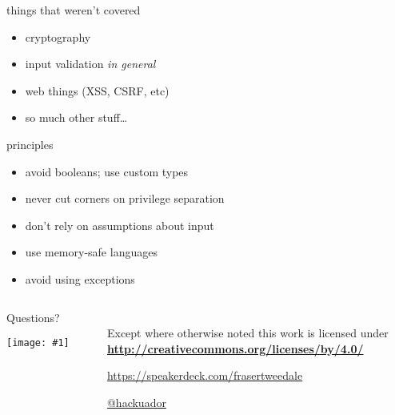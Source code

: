 \documentclass[ignorenonframetext,aspectratio=169]{beamer}
\makeatletter
\def\maxwidth{\ifdim\Gin@nat@width>\linewidth\linewidth\else\Gin@nat@width\fi}
\def\maxheight{\ifdim\Gin@nat@height>\textheight0.8\textheight\else\Gin@nat@height\fi}
\newcommand{\includegraphicsscaled}[1]{
    \texttt{[image: \#1]}
}
\providecommand{\tightlist}{%
  \setlength{\itemsep}{0pt}\setlength{\parskip}{0pt}}
\makeatother
\begin{document}
\begin{frame}{things that weren't covered}
\begin{itemize}
\tightlist
\item cryptography
\item input validation {\em in general}
\item web things (XSS, CSRF, etc)
\item so much other stuff\ldots{}
\end{itemize}
\end{frame}

\begin{frame}{principles}
\begin{itemize}
\tightlist
\item avoid booleans; use custom types
\item never cut corners on privilege separation
\item don't rely on assumptions about input
\item use memory-safe languages
\item avoid using exceptions
\end{itemize}
\end{frame}




\begin{frame}[plain]
\begin{columns}

  \begin{column}{.4\textwidth}
    \begin{center}
    {
        \Large Questions?\\
        \medskip
        \includegraphicsscaled{sailor-victim.jpg}
    }
    \end{center}


  \end{column}

  \begin{column}{.6\textwidth}
    \hypersetup{urlcolor=black}

    \setlength{\parskip}{.5em}

    { \centering

    
    \\
    { \scriptsize
    Except where otherwise noted this work is licensed under
    }\\
    { \footnotesize
      \textbf{\url{http://creativecommons.org/licenses/by/4.0/}}
    }

    \bigskip
    \large \tt

    \url{https://speakerdeck.com/frasertweedale}

    \href{https://twitter.com/hackuador}{@hackuador}

    }
  \end{column}

\end{columns}
\end{frame}
\end{document}
